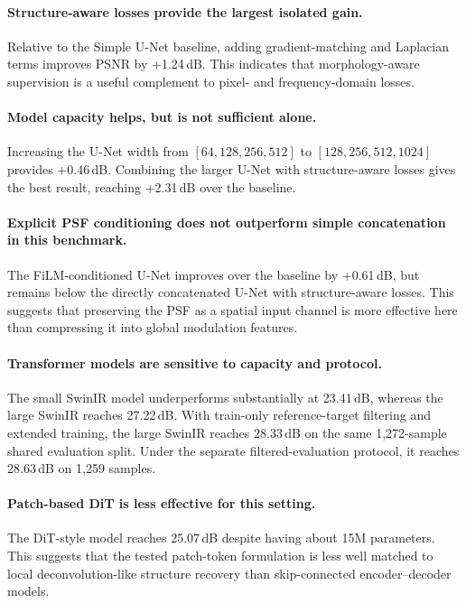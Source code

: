 \documentclass[twocolumn]{aastex631}
\begin{document}
\paragraph{Structure-aware losses provide the largest isolated gain.}
Relative to the Simple U-Net baseline, adding gradient-matching and Laplacian terms improves PSNR by +1.24\,dB.
This indicates that morphology-aware supervision is a useful complement to pixel- and frequency-domain losses.

\paragraph{Model capacity helps, but is not sufficient alone.}
Increasing the U-Net width from $[64, 128, 256, 512]$ to $[128, 256, 512, 1024]$ provides +0.46\,dB.
Combining the larger U-Net with structure-aware losses gives the best result, reaching +2.31\,dB over the baseline.

\paragraph{Explicit PSF conditioning does not outperform simple concatenation in this benchmark.}
The FiLM-conditioned U-Net improves over the baseline by +0.61\,dB, but remains below the directly concatenated U-Net with structure-aware losses.
This suggests that preserving the PSF as a spatial input channel is more effective here than compressing it into global modulation features.

\paragraph{Transformer models are sensitive to capacity and protocol.}
The small SwinIR model underperforms substantially at 23.41\,dB, whereas the large SwinIR reaches 27.22\,dB.
With train-only reference-target filtering and extended training, the large SwinIR reaches 28.33\,dB on the same 1,272-sample shared evaluation split.
Under the separate filtered-evaluation protocol, it reaches 28.63\,dB on 1,259 samples.

\paragraph{Patch-based DiT is less effective for this setting.}
The DiT-style model reaches 25.07\,dB despite having about 15M parameters.
This suggests that the tested patch-token formulation is less well matched to local deconvolution-like structure recovery than skip-connected encoder--decoder models.
\end{document}
